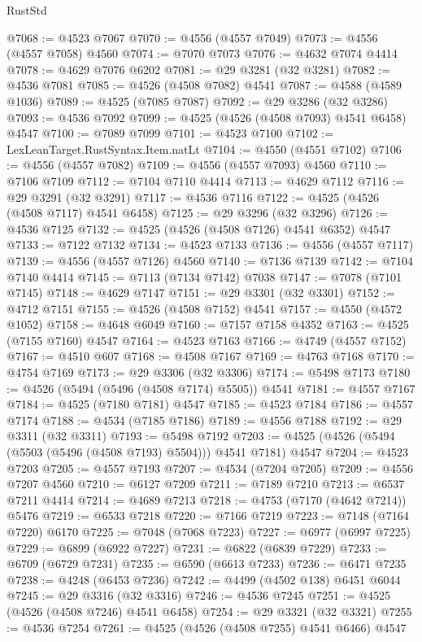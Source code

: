 \begin{lexlean}{RustStd}
\begin{coremodule}
@7068 := @4523 @7067
@7070 := @4556 (@4557 @7049)
@7073 := @4556 (@4557 @7058) @4560
@7074 := @7070 @7073
@7076 := @4632 @7074 @4414
@7078 := @4629 @7076 @6202
@7081 := @29 @3281 (@32 @3281)
@7082 := @4536 @7081
@7085 := @4526 (@4508 @7082) @4541
@7087 := @4588 (@4589 @1036)
@7089 := @4525 (@7085 @7087)
@7092 := @29 @3286 (@32 @3286)
@7093 := @4536 @7092
@7099 := @4525 (@4526 (@4508 @7093) @4541 @6458) @4547
@7100 := @7089 @7099
@7101 := @4523 @7100
@7102 := LexLeanTarget.RustSyntax.Item.natLt
@7104 := @4550 (@4551 @7102)
@7106 := @4556 (@4557 @7082)
@7109 := @4556 (@4557 @7093) @4560
@7110 := @7106 @7109
@7112 := @7104 @7110 @4414
@7113 := @4629 @7112
@7116 := @29 @3291 (@32 @3291)
@7117 := @4536 @7116
@7122 := @4525 (@4526 (@4508 @7117) @4541 @6458)
@7125 := @29 @3296 (@32 @3296)
@7126 := @4536 @7125
@7132 := @4525 (@4526 (@4508 @7126) @4541 @6352) @4547
@7133 := @7122 @7132
@7134 := @4523 @7133
@7136 := @4556 (@4557 @7117)
@7139 := @4556 (@4557 @7126) @4560
@7140 := @7136 @7139
@7142 := @7104 @7140 @4414
@7145 := @7113 (@7134 @7142) @7038
@7147 := @7078 (@7101 @7145)
@7148 := @4629 @7147
@7151 := @29 @3301 (@32 @3301)
@7152 := @4712 @7151
@7155 := @4526 (@4508 @7152) @4541
@7157 := @4550 (@4572 @1052)
@7158 := @4648 @6049
@7160 := @7157 @7158 @4352
@7163 := @4525 (@7155 @7160) @4547
@7164 := @4523 @7163
@7166 := @4749 (@4557 @7152)
@7167 := @4510 @607
@7168 := @4508 @7167
@7169 := @4763 @7168
@7170 := @4754 @7169
@7173 := @29 @3306 (@32 @3306)
@7174 := @5498 @7173
@7180 := @4526 (@5494 (@5496 (@4508 @7174) @5505)) @4541
@7181 := @4557 @7167
@7184 := @4525 (@7180 @7181) @4547
@7185 := @4523 @7184
@7186 := @4557 @7174
@7188 := @4534 (@7185 @7186)
@7189 := @4556 @7188
@7192 := @29 @3311 (@32 @3311)
@7193 := @5498 @7192
@7203 := @4525 (@4526 (@5494 (@5503 (@5496 (@4508 @7193) @5504))) @4541 @7181) @4547
@7204 := @4523 @7203
@7205 := @4557 @7193
@7207 := @4534 (@7204 @7205)
@7209 := @4556 @7207 @4560
@7210 := @6127 @7209
@7211 := @7189 @7210
@7213 := @6537 @7211 @4414
@7214 := @4689 @7213
@7218 := @4753 (@7170 (@4642 @7214)) @5476
@7219 := @6533 @7218
@7220 := @7166 @7219
@7223 := @7148 (@7164 @7220) @6170
@7225 := @7048 (@7068 @7223)
@7227 := @6977 (@6997 @7225)
@7229 := @6899 (@6922 @7227)
@7231 := @6822 (@6839 @7229)
@7233 := @6709 (@6729 @7231)
@7235 := @6590 (@6613 @7233)
@7236 := @6471 @7235
@7238 := @4248 (@6453 @7236)
@7242 := @4499 (@4502 @138) @6451 @6044
@7245 := @29 @3316 (@32 @3316)
@7246 := @4536 @7245
@7251 := @4525 (@4526 (@4508 @7246) @4541 @6458)
@7254 := @29 @3321 (@32 @3321)
@7255 := @4536 @7254
@7261 := @4525 (@4526 (@4508 @7255) @4541 @6466) @4547

\end{coremodule}
\end{lexlean}
